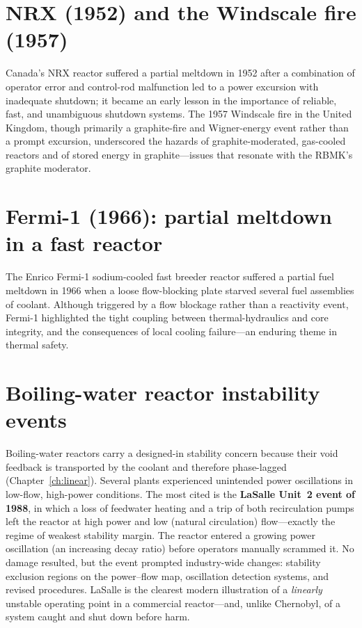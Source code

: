 \section{NRX (1952) and the Windscale fire (1957)}

Canada's NRX reactor suffered a partial meltdown in 1952 after a combination of
operator error and control-rod malfunction led to a power excursion with
inadequate shutdown; it became an early lesson in the importance of reliable,
fast, and unambiguous shutdown systems. The 1957 Windscale fire in the United
Kingdom, though primarily a graphite-fire and Wigner-energy event rather than a
prompt excursion, underscored the hazards of graphite-moderated, gas-cooled
reactors and of stored energy in graphite---issues that resonate with the RBMK's
graphite moderator.

\section{Fermi-1 (1966): partial meltdown in a fast reactor}

The Enrico Fermi-1 sodium-cooled fast breeder reactor suffered a partial fuel
meltdown in 1966 when a loose flow-blocking plate starved several fuel assemblies
of coolant. Although triggered by a flow blockage rather than a reactivity event,
Fermi-1 highlighted the tight coupling between thermal-hydraulics and core
integrity, and the consequences of local cooling failure---an enduring theme in
thermal safety.

\section{Boiling-water reactor instability events}

Boiling-water reactors carry a designed-in stability concern because their void
feedback is transported by the coolant and therefore phase-lagged
(Chapter~\ref{ch:linear}). Several plants experienced unintended power
oscillations in low-flow, high-power conditions. The most cited is the
\textbf{LaSalle Unit~2 event of 1988}, in which a loss of feedwater heating and a
trip of both recirculation pumps left the reactor at high power and low (natural
circulation) flow---exactly the regime of weakest stability margin. The reactor
entered a growing power oscillation (an increasing decay ratio) before operators
manually scrammed it. No damage resulted, but the event prompted industry-wide
changes: stability exclusion regions on the power--flow map, oscillation detection
systems, and revised procedures. LaSalle is the clearest modern illustration of a
\emph{linearly} unstable operating point in a commercial reactor---and, unlike
Chernobyl, of a system caught and shut down before harm.

